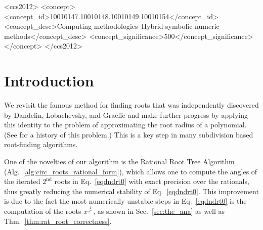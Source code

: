 \documentclass[sigconf]{acmart}
\begin{document}
\begin{CCSXML}
<ccs2012>
   <concept>
       <concept_id>10010147.10010148.10010149.10010154</concept_id>
       <concept_desc>Computing methodologies~Hybrid symbolic-numeric methods</concept_desc>
       <concept_significance>500</concept_significance>
       </concept>
 </ccs2012>
\end{CCSXML}






\maketitle

\section{Introduction}
We revisit the famous method for finding roots that was independently discovered by Dandelin, Lobachevsky, and Graeffe and make further progress by applying this identity to the problem of approximating the root radius of a polynomial. (See \cite{10.2307/2310626} for a history of this problem.)
This is a key step in many subdivision based root-finding algorithms. 

One of the novelties of our algorithm is the Rational Root Tree Algorithm (Alg.~\ref{alg:circ_roots_rational_form}), which allows one to compute the angles of the iterated $2^\mathrm{nd}$ roots in Eq.~\ref{eqdndrt0} with exact precision over the rationals, thus greatly reducing the numerical stability of Eq.~\ref{eqdndrt0}. This improvement is due to the fact the most numerically unstable steps in Eq.~\ref{eqdndrt0} is the computation of the roots $x^{\frac{1}{2^m}}$, as shown in Sec.~\ref{sec:the_ana} as well as Thm.~\ref{thm:rat_root_correctness}.
\end{document}
